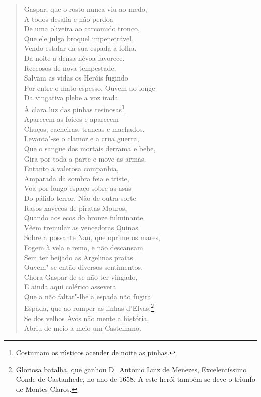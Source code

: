 \begin{verse}
Gaspar, que o rosto nunca viu ao medo,\\
A todos desafia e não perdoa\\
De uma oliveira ao carcomido tronco,\\
Que ele julga broquel impenetrável,\\
Vendo estalar da sua espada a folha. \\[10pt]


Da noite a densa névoa favorece.\\
Receosos de nova tempestade,\\
Salvam as vidas os Heróis fugindo\\
Por entre o mato espesso. Ouvem ao longe\\
Da vingativa plebe a voz irada.\\
À clara luz das pinhas resinosas\footnote{ Costumam os rústicos acender de noite as pinhas.}\\
Aparecem as foices e aparecem\\
Chuços, cacheiras, trancas e machados.\\
Levanta"-se o clamor e a crua guerra,\\
Que o sangue dos mortais derrama e bebe,\\
Gira por toda a parte e move as armas.\\
Entanto a valerosa companhia,\\
Amparada da sombra feia e triste,\\
Voa por longo espaço sobre as asas\\
Do pálido terror. Não de outra sorte\\
Rasos xavecos de piratas Mouros,\\		\index{\Xavec}
Quando aos ecos do bronze fulminante\\
Vêem tremular as vencedoras Quinas\\
Sobre a possante Nau, que oprime os mares,\\
Fogem à vela e remo, e não descansam\\
Sem ter beijado as Argelinas praias.\\
Ouvem"-se  então diversos sentimentos.\\
Chora Gaspar de se não ter vingado,\\
E ainda aqui colérico assevera\\		\index{\Coler}
Que a não faltar"-lhe a espada não fugira.\\
Espada, que ao romper as linhas d'Elvas,\footnote{ Gloriosa batalha,
que ganhou D.~Antonio Luiz de Menezes, Excelentíssimo Conde de Castanhede, no
ano de 1658. A este herói também se deve o triunfo de Montes Claros.}\\		\index{\Elvas}
Se dos velhos Avós não mente a história,\\
Abriu de meio a meio um Castelhano. \\[10pt] 



\end{verse}

